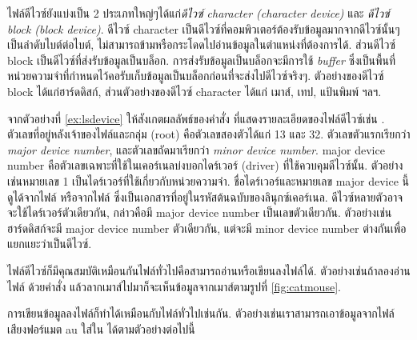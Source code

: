 \begin{thwbr}
ไฟล์ดีไวซ์ยังแบ่งเป็น 2 ประเภทใหญ่ๆได้แก่\emph{ดีไวซ์ character (character device)} และ \emph{ดีไวซ์ block (block device)}. ดีไวซ์ character  เป็นดีไวซ์ที่คอมพิวเตอร์ต้องรับข้อมูลมากจากดีไวซ์นั้นๆเป็นลำดับไบต์ต่อไบต์, ไม่สามารถข้ามหรือกระโดดไปอ่านข้อมูลในตำแหน่งที่ต้องการได้. ส่วนดีไวซ์ block เป็นดีไวซ์ที่ส่งรับข้อมูลเป็นบล็อก. การส่งรับข้อมูลเป็นบล็อกจะมีการใช้ \emph{buffer} ซึ่งเป็นพื้นที่หน่วยความจำที่กำหนดไว้คอรับเก็บข้อมูลเป็นบล็อกก่อนที่จะส่งไปดีไวซ์จริงๆ. ตัวอย่างของดีไวซ์ block ได้แก่ฮาร์ดดิสก์, ส่วนตัวอย่างของดีไวซ์ character ได้แก่ เมาส์, เทป, แป้นพิมพ์ ฯลฯ.

จากตัวอย่างที่ \ref{ex:lsdevice} ให้สังเกตผลลัพธ์ของคำสั่ง  ที่แสดงรายละเอียดของไฟล์ดีไวซ์เช่น . ตัวเลขที่อยู่หลังเจ้าของไฟล์และกลุ่ม (root) คือตัวเลขสองตัวได้แก่ 13 และ 32. ตัวเลขตัวแรกเรียกว่า \emph{major device number}, และตัวเลขถัดมาเรียกว่า \emph{minor device number}. major device number คือตัวเลขเฉพาะที่ใช้ในเคอร์เนลบ่งบอกไดร์เวอร์ (driver) ที่ใช้ควบคุมดีไวซ์นั้น. ตัวอย่างเช่นหมายเลข 1 เป็นไดร์เวอร์ที่ใช้เกี่ยวกับหน่วยความจำ. ชื่อไดร์เวอร์และหมายเลข major device นี้ดูได้จากไฟล์  หรือจากไฟล์  ซึ่งเป็นเอกสารที่อยู่ในรหัสต้นฉบับของลินุกซ์เคอร์เนล. ดีไวซ์หลายตัวอาจจะใช้ไดร์เวอร์ตัวเดียวกัน, กล่าวคือมี major device number เป็นเลขตัวเดียวกัน. ตัวอย่างเช่นฮาร์ดดิสก์จะมี major device number ตัวเดียวกัน, แต่จะมี minor device number ต่างกันเพื่อแยกแยะว่าเป็นดีไวซ์.

\medskip
ไฟล์ดีไวซ์ก็มีคุณสมบัติเหมือนกันไฟล์ทั่วไปคือสามารถอ่านหรือเขียนลงไฟล์ได้. ตัวอย่างเช่นถ้าลองอ่านไฟล์  ด้วยคำสั่ง  แล้วลากเมาส์ไปมาก็จะเห็นข้อมูลจากเมาส์ตามรูปที่ \ref{fig:catmouse}.

\begin{figure}[!htb]
\end{figure}

การเขียนข้อมูลลงไฟล์ก็ทำได้เหมือนกับไฟล์ทั่วไปเช่นกัน. ตัวอย่างเช่นเราสามารถเอาข้อมูลจากไฟล์เสียงฟอร์แมต au %
ใส่ใน  ได้ตามตัวอย่างต่อไปนี้
\begin{MyExample}
\end{MyExample}%


\end{thwbr}
